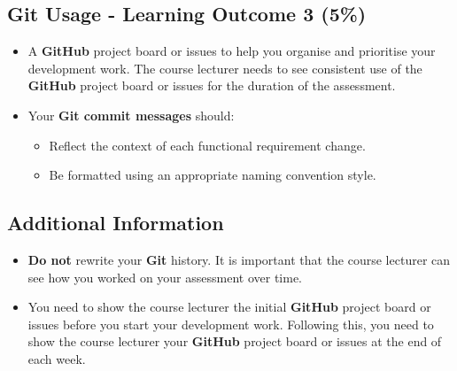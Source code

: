 \documentclass{article}
\begin{document}
\subsection*{Git Usage - Learning Outcome 3 (5\%)}
\begin{itemize}
	\item A \textbf{GitHub} project board or issues to help you organise and prioritise your development work. The course lecturer needs to see consistent use of the \textbf{GitHub} project board or issues for the duration of the assessment.
    \item Your \textbf{Git commit messages} should:
    \begin{itemize}
      \item Reflect the context of each functional requirement change.
      \item Be formatted using an appropriate naming convention style.
    \end{itemize}
\end{itemize}

\subsection*{Additional Information}
\begin{itemize}
    \item \textbf{Do not} rewrite your \textbf{Git} history. It is important that the course lecturer can see how you worked on your assessment over time. 
    \item You need to show the course lecturer the initial \textbf{GitHub} project board or issues before you start your development work. Following this, you need to show the course lecturer your \textbf{GitHub} project board or issues at the end of each week.
\end{itemize} 
\end{document}
